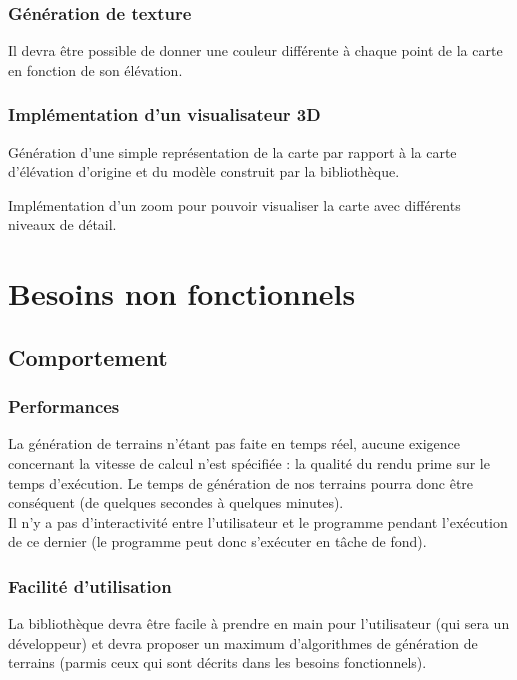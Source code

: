 \subsubsection{Génération de texture}
Il devra être possible de donner une couleur différente à chaque point de la carte en
fonction de son élévation.

\subsubsection{Implémentation d'un visualisateur 3D}
Génération d'une simple représentation de la carte par rapport à la
carte d'élévation d'origine et du modèle construit par la bibliothèque.

Implémentation d'un zoom pour pouvoir visualiser la carte avec différents niveaux
de détail.


\section{Besoins non fonctionnels}

\subsection{Comportement}

\subsubsection{Performances}
La génération de terrains n'étant pas faite en temps réel, aucune exigence
concernant la vitesse de calcul n'est spécifiée : la qualité du rendu prime sur
le temps d'exécution. Le temps de génération de nos terrains pourra donc \^etre conséquent (de quelques secondes à quelques minutes).\\

Il n'y a pas d'interactivité entre l'utilisateur et le programme pendant l'exécution de ce dernier (le programme peut donc s'exécuter en tâche de fond).\\

\subsubsection{Facilité d'utilisation}
La bibliothèque devra \^etre facile à prendre en main pour l'utilisateur (qui sera un développeur) et devra proposer un maximum d'algorithmes de génération de terrains (parmis ceux qui sont décrits dans les besoins fonctionnels).\\


